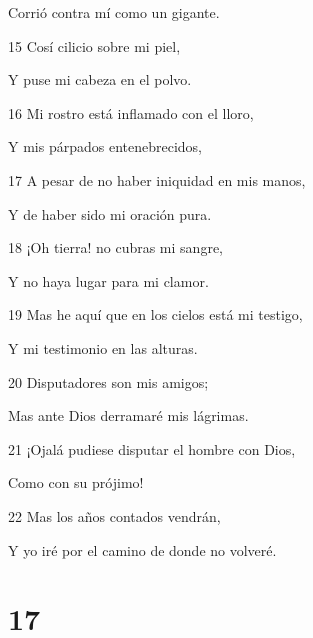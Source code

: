 \par Corrió contra mí como un gigante.
\par 15 Cosí cilicio sobre mi piel,
\par Y puse mi cabeza en el polvo.
\par 16 Mi rostro está inflamado con el lloro,
\par Y mis párpados entenebrecidos,
\par 17 A pesar de no haber iniquidad en mis manos,
\par Y de haber sido mi oración pura.
\par 18 ¡Oh tierra! no cubras mi sangre,
\par Y no haya lugar para mi clamor.
\par 19 Mas he aquí que en los cielos está mi testigo,
\par Y mi testimonio en las alturas.
\par 20 Disputadores son mis amigos;
\par Mas ante Dios derramaré mis lágrimas.
\par 21 ¡Ojalá pudiese disputar el hombre con Dios,
\par Como con su prójimo!
\par 22 Mas los años contados vendrán,
\par Y yo iré por el camino de donde no volveré.

\chapter{17}

